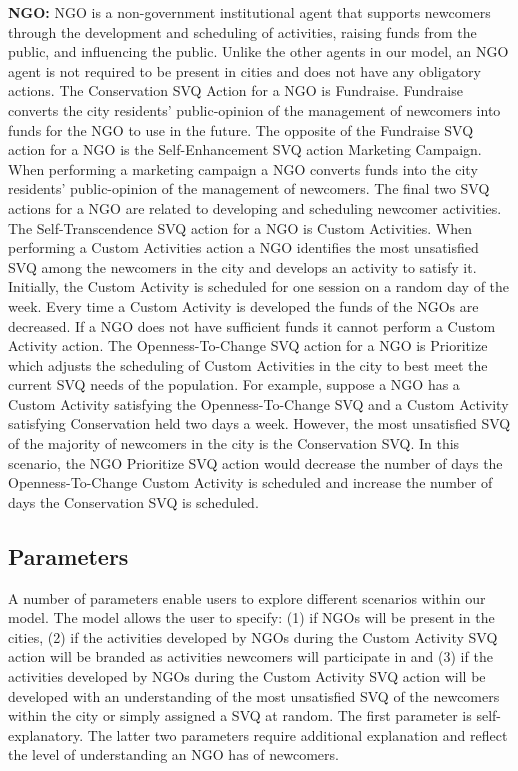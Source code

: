 \documentclass{scspaperproc}
\theoremstyle{scsthe}
\begin{document}
{\bf NGO:} NGO is a non-government institutional agent that supports newcomers through the development and scheduling of activities, raising funds from the public, and influencing the public. Unlike the other agents in our model, an NGO agent is not required to be present in cities and does not have any obligatory actions. The Conservation SVQ Action for a NGO is Fundraise. Fundraise converts the city residents' public-opinion of the management of newcomers into funds for the NGO to use in the future. The opposite of the Fundraise SVQ action for a NGO is the Self-Enhancement SVQ action Marketing Campaign. When performing a marketing campaign a NGO converts funds into the city residents' public-opinion of the management of newcomers. The final two SVQ actions for a NGO are related to developing and scheduling newcomer activities. The Self-Transcendence SVQ action for a NGO is Custom Activities. When performing a Custom Activities action a NGO identifies the most unsatisfied SVQ among the newcomers in the city and develops an activity to satisfy it. Initially, the Custom Activity is scheduled for one session on a random day of the week. Every time a Custom Activity is developed the funds of the NGOs are decreased. If a NGO does not have sufficient funds it cannot perform a Custom Activity action. The Openness-To-Change SVQ action for a NGO is Prioritize which adjusts the scheduling of Custom Activities in the city to best meet the current SVQ needs of the population. For example, suppose a NGO has a Custom Activity satisfying the Openness-To-Change SVQ and a Custom Activity satisfying Conservation held two days a week. However, the most unsatisfied SVQ of the majority of newcomers in the city is the Conservation SVQ. In this scenario, the NGO Prioritize SVQ action would decrease the number of days the Openness-To-Change Custom Activity is scheduled and increase the number of days the Conservation SVQ is scheduled.

\subsection{Parameters}
A number of parameters enable users to explore different scenarios within our model. The model allows the user to specify: (1) if NGOs will be present in the cities, (2) if the activities developed by NGOs during the Custom Activity SVQ action will be branded as activities newcomers will participate in and (3) if the activities developed by NGOs during the Custom Activity SVQ action will be developed with an understanding of the most unsatisfied SVQ of the newcomers within the city or simply assigned a SVQ at random. The first parameter is self-explanatory. The latter two parameters require additional explanation and reflect the level of understanding an NGO has of newcomers. 
\end{document}

